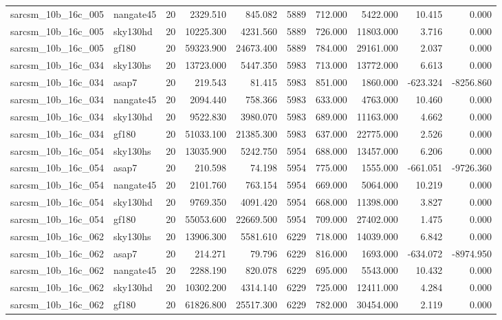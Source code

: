 \documentclass{article}
\begin{document}
\begin{longtable}{llrrrrrrrr}
sarcsm\_10b\_16c\_005 & nangate45 & 20 & 2329.510 & 845.082 & 5889 & 712.000 & 5422.000 & 10.415 & 0.000 \\
sarcsm\_10b\_16c\_005 & sky130hd & 20 & 10225.300 & 4231.560 & 5889 & 726.000 & 11803.000 & 3.716 & 0.000 \\
sarcsm\_10b\_16c\_005 & gf180 & 20 & 59323.900 & 24673.400 & 5889 & 784.000 & 29161.000 & 2.037 & 0.000 \\
sarcsm\_10b\_16c\_034 & sky130hs & 20 & 13723.000 & 5447.350 & 5983 & 713.000 & 13772.000 & 6.613 & 0.000 \\
sarcsm\_10b\_16c\_034 & asap7 & 20 & 219.543 & 81.415 & 5983 & 851.000 & 1860.000 & -623.324 & -8256.860 \\
sarcsm\_10b\_16c\_034 & nangate45 & 20 & 2094.440 & 758.366 & 5983 & 633.000 & 4763.000 & 10.460 & 0.000 \\
sarcsm\_10b\_16c\_034 & sky130hd & 20 & 9522.830 & 3980.070 & 5983 & 689.000 & 11163.000 & 4.662 & 0.000 \\
sarcsm\_10b\_16c\_034 & gf180 & 20 & 51033.100 & 21385.300 & 5983 & 637.000 & 22775.000 & 2.526 & 0.000 \\
sarcsm\_10b\_16c\_054 & sky130hs & 20 & 13035.900 & 5242.750 & 5954 & 688.000 & 13457.000 & 6.206 & 0.000 \\
sarcsm\_10b\_16c\_054 & asap7 & 20 & 210.598 & 74.198 & 5954 & 775.000 & 1555.000 & -661.051 & -9726.360 \\
sarcsm\_10b\_16c\_054 & nangate45 & 20 & 2101.760 & 763.154 & 5954 & 669.000 & 5064.000 & 10.219 & 0.000 \\
sarcsm\_10b\_16c\_054 & sky130hd & 20 & 9769.350 & 4091.420 & 5954 & 668.000 & 11398.000 & 3.827 & 0.000 \\
sarcsm\_10b\_16c\_054 & gf180 & 20 & 55053.600 & 22669.500 & 5954 & 709.000 & 27402.000 & 1.475 & 0.000 \\
sarcsm\_10b\_16c\_062 & sky130hs & 20 & 13906.300 & 5581.610 & 6229 & 718.000 & 14039.000 & 6.842 & 0.000 \\
sarcsm\_10b\_16c\_062 & asap7 & 20 & 214.271 & 79.796 & 6229 & 816.000 & 1693.000 & -634.072 & -8974.950 \\
sarcsm\_10b\_16c\_062 & nangate45 & 20 & 2288.190 & 820.078 & 6229 & 695.000 & 5543.000 & 10.432 & 0.000 \\
sarcsm\_10b\_16c\_062 & sky130hd & 20 & 10302.200 & 4314.140 & 6229 & 725.000 & 12411.000 & 4.284 & 0.000 \\
sarcsm\_10b\_16c\_062 & gf180 & 20 & 61826.800 & 25517.300 & 6229 & 782.000 & 30454.000 & 2.119 & 0.000 \\

\end{longtable}
\end{document}
